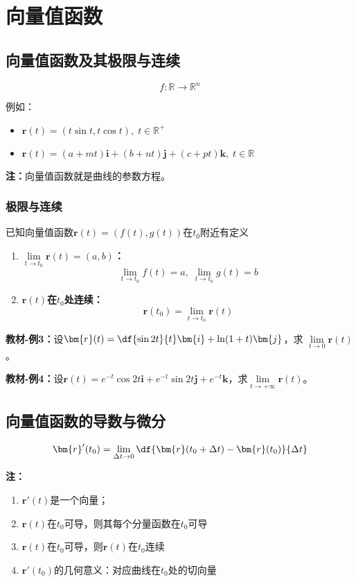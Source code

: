 \setcounter{chapter}{8}

\chapter{向量值函数}

\section{向量值函数及其极限与连续}

$$f:\mathbb{R}\to\mathbb{R}^n$$

例如：
\begin{itemize}
  \setlength{\itemindent}{1cm}
  \item $\bm{r}(t)=(t\sin t, t\cos t),\;t\in\mathbb{R}^+$ 
  \item
  $\bm{r}(t)=(a+mt)\bm{i}+(b+nt)\bm{j}+(c+pt)\bm{k},\;t\in\mathbb{R}$ 
\end{itemize}

{\bf 注：}向量值函数就是曲线的参数方程。

\subsection{极限与连续}

已知向量值函数$\bm{r}(t)=(f(t),g(t))$在$t_0$附近有定义 
\begin{enumerate}[(1)]
  \setlength{\itemindent}{1cm}
  \item {\bf $\lim\limits_{t\to t_0}\bm{r}(t)=(a,b)$：}
  $$\lim\limits_{t\to t_0}f(t)=a,\;\lim\limits_{t\to t_0}g(t)=b$$
  \item {\bf $\bm{r}(t)$在$t_0$处连续：}
  $$\bm{r}(t_0)=\lim\limits_{t\to t_0}\bm{r}(t)$$
\end{enumerate}

{\bf 教材-例3：}设$\bm{r}(t)=\df{\sin 2t}{t}\bm{i}+\ln(1+t)\bm{j}$，求
$\lim\limits_{t\to 0}\bm{r}(t)$。

{\bf  教材-例4：}设$\bm{r}(t)=e^{-t}\cos 2t\bm{i}+e^{-t}\sin 2t
\bm{j}+e^{-t}\bm{k}$，求$\lim\limits_{t\to +\infty}\bm{r}(t)$。

\section{向量值函数的导数与微分}

$$\bm{r}'(t_0)=\lim\limits_{\Delta t\to 0}
\df{\bm{r}(t_0+\Delta t)-\bm{r}(t_0)}{\Delta t}$$

{\bf 注：}
\begin{enumerate}[(1)]
  \setlength{\itemindent}{1cm}
  \item $\bm{r}'(t)$是一个向量；
  \item $\bm{r}(t)$在$t_0$可导，则其每个分量函数在$t_0$可导
  \item $\bm{r}(t)$在$t_0$可导，则$\bm{r}(t)$在$t_0$连续 
  \item $\bm{r}'(t_0)$的几何意义：对应曲线在$t_0$处的切向量
\end{enumerate}

